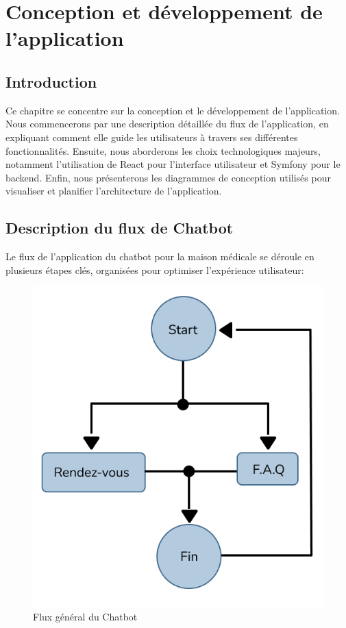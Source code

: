 \chapter{Conception et développement de l’application}
\label{chap:Chapter 3 title}
\section*{Introduction}

\hspace{16pt}Ce chapitre se concentre sur la conception et le développement de l'application. Nous commencerons par une description détaillée du flux de l'application, en expliquant comment elle guide les utilisateurs à travers ses différentes fonctionnalités. Ensuite, nous aborderons les choix technologiques majeurs, notamment l'utilisation de React pour l'interface utilisateur et Symfony pour le backend. Enfin, nous présenterons les diagrammes de conception utilisés pour visualiser et planifier l'architecture de l'application.

\newpage


\section{Description du flux de Chatbot}

\hspace{16pt}Le flux de l'application du chatbot pour la maison médicale se déroule en plusieurs étapes clés, organisées pour optimiser l'expérience utilisateur:

\begin{figure}[H] 
    \centering
    \includegraphics[scale=0.8]{Figures/cbf_overall.png}
    \caption{Flux général du Chatbot}
\end{figure}

